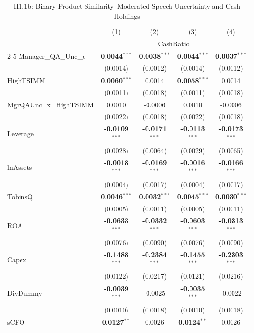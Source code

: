 \documentclass[11pt,a4paper]{article}
\begin{document}
\begin{table}[htbp]
\centering
\caption{H1.1b: Binary Product Similarity--Moderated Speech Uncertainty and Cash Holdings}
\label{tab:h1_1b}
\scriptsize
\begin{tabular}{lcccc}
\toprule
 & (1) & (2) & (3) & (4) \\
 & \multicolumn{4}{c}{CashRatio} \\
\cmidrule(lr){2-5}
\midrule
Manager\_QA\_Unc\_c & \textbf{0.0044}$^{***}$ & \textbf{0.0038}$^{***}$ & \textbf{0.0044}$^{***}$ & \textbf{0.0037}$^{***}$ \\
 & (0.0014) & (0.0012) & (0.0014) & (0.0012) \\
HighTSIMM & \textbf{0.0060}$^{***}$ & 0.0014 & \textbf{0.0058}$^{***}$ & 0.0014 \\
 & (0.0011) & (0.0018) & (0.0011) & (0.0018) \\
MgrQAUnc\_x\_HighTSIMM & 0.0010 & -0.0006 & 0.0010 & -0.0006 \\
 & (0.0022) & (0.0018) & (0.0022) & (0.0018) \\
\midrule
Leverage & \textbf{-0.0109}$^{***}$ & \textbf{-0.0171}$^{***}$ & \textbf{-0.0113}$^{***}$ & \textbf{-0.0173}$^{***}$ \\
 & (0.0028) & (0.0064) & (0.0029) & (0.0065) \\
lnAssets & \textbf{-0.0018}$^{***}$ & \textbf{-0.0169}$^{***}$ & \textbf{-0.0016}$^{***}$ & \textbf{-0.0166}$^{***}$ \\
 & (0.0004) & (0.0017) & (0.0004) & (0.0017) \\
TobinsQ & \textbf{0.0046}$^{***}$ & \textbf{0.0032}$^{***}$ & \textbf{0.0045}$^{***}$ & \textbf{0.0030}$^{***}$ \\
 & (0.0005) & (0.0011) & (0.0005) & (0.0011) \\
ROA & \textbf{-0.0633}$^{***}$ & \textbf{-0.0332}$^{***}$ & \textbf{-0.0603}$^{***}$ & \textbf{-0.0313}$^{***}$ \\
 & (0.0076) & (0.0090) & (0.0076) & (0.0090) \\
Capex & \textbf{-0.1488}$^{***}$ & \textbf{-0.2384}$^{***}$ & \textbf{-0.1455}$^{***}$ & \textbf{-0.2303}$^{***}$ \\
 & (0.0122) & (0.0217) & (0.0121) & (0.0216) \\
DivDummy & \textbf{-0.0039}$^{***}$ & -0.0025 & \textbf{-0.0035}$^{***}$ & -0.0022 \\
 & (0.0010) & (0.0018) & (0.0010) & (0.0018) \\
sCFO & \textbf{0.0127}$^{**}$ & 0.0026 & \textbf{0.0124}$^{**}$ & 0.0026 \\

\end{tabular}
\end{table}
\end{document}
